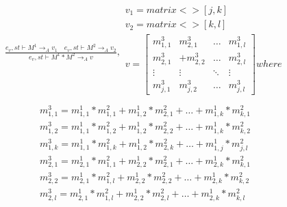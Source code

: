 \begin{minipage}{1.0\textwidth}
\begin{equation}\label{hypeproduct}
\begin{aligned}
	\frac { { e }_{ v },st\vdash { M }^{ 1 }{ \rightarrow  }_{ A }{ v }_{ 1 }\quad { e }_{ v },st\vdash { M }^{ 2 }{ \rightarrow  }_{ A }{ v }_{ 2 } }{ { e }_{ v },st\vdash { M }^{ 1 }*{ M }^{ 2 }{ \rightarrow  }_{ A }{ v } } ,\begin{matrix} { v }_{ 1 }=matrix<>[j,k] \\ { v }_{ 2 }=matrix<>[k,l] \\
	 v=\begin{bmatrix} { { m }_{ 1,1 }^{ 3 } } & { { m }_{ 2,1 }^{ 3 } } & \dots  & { m }_{ 1,l }^{ 3 }\\
{ { m }_{ 2,1 }^{ 3 } } &   +{ { m }_{ 2,2 }^{ 3 } } & \dots & { { m }_{ 2,l }^{ 3 } }
\\ \vdots  & \vdots & \ddots  & \vdots  \\
 { m }_{ j,1 }^{ 3 }& { { m }_{ j,2 }^{ 3 } } & \dots & { m }_{ j,l }^{ 3 } \end{bmatrix} where
\\ \end{matrix}
\end{aligned}
\end{equation}
\begin{equation*}
\begin{aligned}
{ { m }_{ 1,1 }^{ 3 } }  = { { m }_{ 1,1 }^{ 1 } } *{ { m }_{ 1,1 }^{ 2 } }+ { { m }_{ 1,2 }^{ 1 } } *{ { m }_{ 2,1 }^{ 2 } }+\dots+ { { m }_{ 1,k }^{ 1 } } *{ { m }_{ k,1 }^{ 2 } }\\
{ { m }_{ 1,2 }^{ 3 } }  = { { m }_{ 1,1 }^{ 1 } } *{ { m }_{ 1,2 }^{ 2 } }+ { { m }_{ 1,2 }^{ 1 } } *{ { m }_{ 2,2 }^{ 2 } }+\dots+ { { m }_{ 1,k }^{ 1 } } *{ { m }_{ k,2 }^{ 2 } }\\
{ { m }_{ 1,k }^{ 3 } }  = { { m }_{ 1,1 }^{ 1 } } *{ { m }_{ 1,k }^{ 2 } }+ { { m }_{ 1,2 }^{ 1 } } *{ { m }_{ 2,k }^{ 2 } }+\dots+ { { m }_{ 1,j }^{ 1 } } *{ { m }_{ j,l }^{ 2 } }\\
{ { m }_{ 2,1 }^{ 3 } }  = { { m }_{ 2,1 }^{ 1 } } *{ { m }_{ 1,1 }^{ 2 } }+ { { m }_{ 2,2 }^{ 1 } } *{ { m }_{ 2,1 }^{ 2 } }+\dots+ { { m }_{ 2,k }^{ 1 } } *{ { m }_{ k,1 }^{ 2 } }\\
{ { m }_{ 2,2 }^{ 3 } }  = { { m }_{ 2,1 }^{ 1 } } *{ { m }_{ 1,l }^{ 2 } }+ { { m }_{ 2,2 }^{ 1 } } *{ { m }_{ 2,2 }^{ 2 } }+\dots+ { { m }_{ 2,k }^{ 1 } } *{ { m }_{ k,2 }^{ 2 } }\\
{ { m }_{ 2,l }^{ 3 } }  = { { m }_{ 2,1 }^{ 1 } } *{ { m }_{ 1,l }^{ 2 } }+ { { m }_{ 2,2 }^{ 1 } } *{ { m }_{ 2,l }^{ 2 } }+\dots+ { { m }_{ 2,k }^{ 1 } } *{ { m }_{ k,l }^{ 2 } }\\

\end{aligned}
\end{equation*}
\end{minipage}

